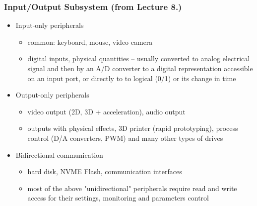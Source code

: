 \documentclass{beamer}
\begin{document}
\begin{frame}
\frametitle{Input/Output Subsystem (from Lecture 8.)}

\begin{itemize}
 \item Input-only peripherals
 \begin{itemize}
  \item common: keyboard, mouse, video camera
  \item digital inputs, physical quantities -- usually converted to analog
electrical signal and then by an A/D converter to a digital representation
accessible on an input port, or directly to to logical (0/1) or its change in time
 \end{itemize}
\end{itemize}
\begin{itemize}
 \item Output-only peripherals
 \begin{itemize}
  \item video output (2D, 3D + acceleration), audio output
  \item outputs with physical effects, 3D printer (rapid prototyping),
process control (D/A converters, PWM) and many
other types of drives
 \end{itemize}
\end{itemize}
\begin{itemize}
 \item Bidirectional communication
 \begin{itemize}
  \item hard disk, NVME Flash, communication interfaces
  \item most of the above "unidirectional" peripherals require read
and write access for their settings, monitoring and parameters
control
 \end{itemize}
\end{itemize}
\end{frame}
\end{document}
